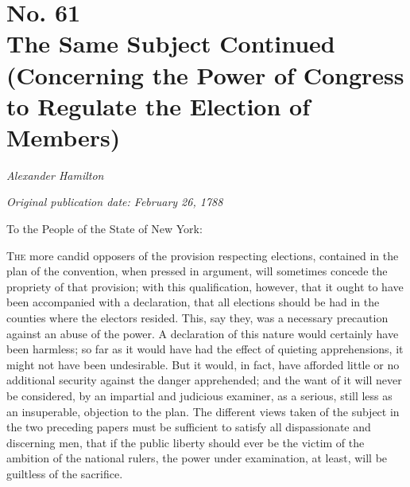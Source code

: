 \chapter[No. 61: The Same Subject Continued (Concerning the Power of Congress to Regulate the Election of Members)]{No. 61\\ {\small The Same Subject Continued (Concerning the Power of Congress to Regulate the Election of Members)}}

\textit{Alexander Hamilton}

\textit{Original publication date: February 26, 1788}
\vspace{1cm}

To the People of the State of New York:
\vspace{.4cm}

\textsc{The} more candid opposers of the provision respecting elections, contained in the plan of the convention, when pressed in argument, will sometimes concede the propriety of that provision; with this qualification, however, that it ought to have been accompanied with a declaration, that all elections should be had in the counties where the electors resided. 
This, say they, was a necessary precaution against an abuse of the power. 
A declaration of this nature would certainly have been harmless; so far as it would have had the effect of quieting apprehensions, it might not have been undesirable. 
But it would, in fact, have afforded little or no additional security against the danger apprehended; and the want of it will never be considered, by an impartial and judicious examiner, as a serious, still less as an insuperable, objection to the plan. 
The different views taken of the subject in the two preceding papers must be sufficient to satisfy all dispassionate and discerning men, that if the public liberty should ever be the victim of the ambition of the national rulers, the power under examination, at least, will be guiltless of the sacrifice.

